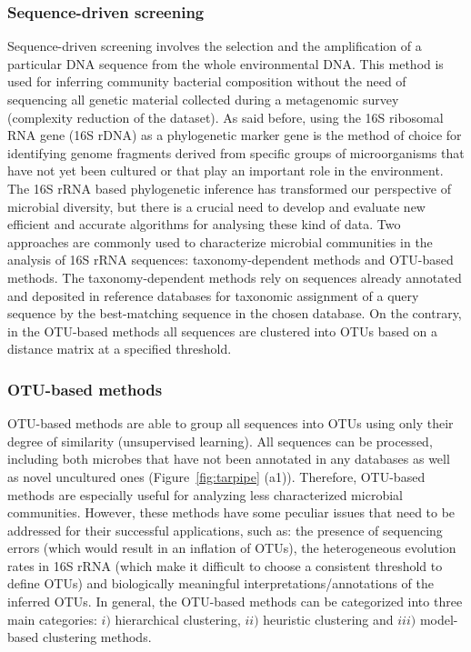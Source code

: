 \subsubsection{Sequence-driven screening}
Sequence-driven screening involves the selection and the amplification of a particular DNA sequence from the whole environmental DNA. This method is used for inferring community bacterial composition without the need of sequencing all genetic material collected during a metagenomic survey (complexity reduction of the dataset). As said before, using the 16S ribosomal RNA gene (16S rDNA) as a phylogenetic marker gene is the method of choice for identifying genome fragments derived from specific groups of microorganisms that have not yet been cultured or that play an important role in the environment. The 16S rRNA based phylogenetic inference has transformed our perspective of microbial diversity, but there is a crucial need to develop and evaluate new efficient and accurate algorithms for analysing these kind of data. Two approaches are commonly used to characterize microbial communities in the analysis of 16S rRNA sequences: taxonomy-dependent methods and OTU-based methods. The taxonomy-dependent methods rely on sequences already annotated and deposited in reference databases for taxonomic assignment of a query sequence by the best-matching sequence in the chosen database. On the contrary, in the OTU-based methods all sequences are clustered into OTUs based on a distance matrix at a specified threshold.\\

\subsubsection*{OTU-based methods \label{par:otumet}}
OTU-based methods are able to group all sequences into OTUs using only their degree of similarity (unsupervised learning). All sequences can be processed, including both microbes that have not been annotated in any databases as well as novel uncultured ones (Figure~\ref{fig:tarpipe} (a1)). Therefore, OTU-based methods are especially useful for analyzing less characterized microbial communities. However, these methods have some peculiar issues that need to be addressed for their successful applications, such as: the presence of sequencing errors (which would result in an inflation of OTUs), the heterogeneous evolution rates in 16S rRNA (which make it difficult to choose a consistent threshold to define OTUs) and biologically meaningful interpretations/annotations of the inferred OTUs. In general, the OTU-based methods can be categorized into three main categories: $i)$ hierarchical clustering, $ii)$ heuristic clustering and $iii)$ model-based clustering methods.

